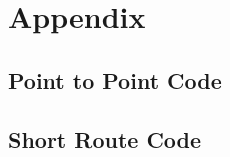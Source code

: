 \documentclass[12pt]{article}
\begin{document}
\newpage





\section*{Appendix}
\subsection*{Point to Point Code}
\begin{tiny}
	
\end{tiny}

\subsection*{Short Route Code}
\begin{tiny}
	
\end{tiny}
\end{document}
